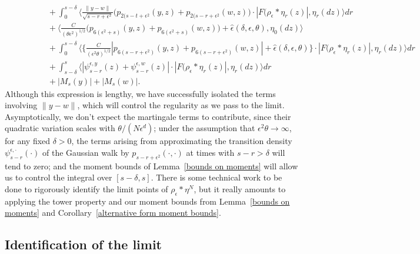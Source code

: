 \documentclass[12pt]{article}
\numberwithin{equation}{section}
\begin{document}
\begin{align}
\nonumber
\\ & \qquad \qquad  {}
+
\int_0^{s-\delta}\Big\langle\frac{\|y-w\|}{\sqrt{s-r+\epsilon^2}}
\big(p_{2(s-t+\epsilon^2}(y,z)+p_{2(s-r+\epsilon^2}(w,z)\big)
\cdot |F(\rho_\epsilon*\eta_r(z)|, 
\eta_r(dz)\Big\rangle dr
\nonumber
\\ & \qquad \qquad  {}
	+ \big\langle \frac{C}{(\theta\epsilon^2)^{1/2}}\Big( 
	p_{6(\epsilon^2+s)}(y,z)+p_{6(\epsilon^2+s)}(w,z)\Big)+
	\widehat{\epsilon}(\delta,\epsilon,\theta) , \eta_0(dz)
\big\rangle
\nonumber
\\ & \qquad \qquad  {}
+
\int_0^{s-\delta}
\big\langle \Big\{
\frac{C}{(\epsilon^2\theta)^{1/2}}
|p_{6(s-r+\epsilon^2)}(y,z)+
p_{6(s-r+\epsilon^2)}(w,z)| +\widehat{\epsilon}(\delta,\epsilon,\theta)\Big\}
\cdot |F(\rho_\epsilon*\eta_r(z)|, 
\eta_r(dz) \big\rangle  dr
\nonumber
    \\ &\qquad \qquad {}
+ \int_{s-\delta}^s \big\langle 
|\psi_{s-r}^{\epsilon,y}(z) + \psi_{s-r}^{\epsilon, w}(z) |
\cdot |F(\rho_\epsilon*\eta_r(z)|, 
\eta_r(dz) \big\rangle  dr
\nonumber
\\ & \qquad \qquad  {}
+ |M_s(y)|+|M_s(w)|. 
\label{difference in rhos}
\end{align} 
Although this expression is lengthy, we have successfully isolated the
terms involving $\|y-w\|$, which will control the regularity as we pass to the
limit. Asymptotically, we 
don't expect the martingale terms to contribute, since their 
quadratic variation scales with $\theta/(N\epsilon^d)$; %
under the assumption that $\epsilon^2\theta\to\infty$,
for any fixed $\delta>0$, %
the terms arising from 
approximating the transition 
density $\psi_{s-r}^{\epsilon, \cdot}(\cdot)$ of the Gaussian 
walk by $p_{s-r+\epsilon^2}(\cdot,\cdot)$ at times 
with $s-r>\delta$ will tend to zero; and  
the moment bounds of Lemma~\ref{bounds on moments} 
will allow us to control the integral over $[s-\delta, s]$.
There is some technical work to be done to rigorously identify the
limit points of $\rho_\epsilon*\eta^N$, but 
it really amounts to 
applying the tower property and our moment bounds from 
Lemma~\ref{bounds on moments} and 
Corollary~\ref{alternative form moment bounds}.


\subsection{Identification of the limit}
\label{limit in onestep case}
\end{document}
